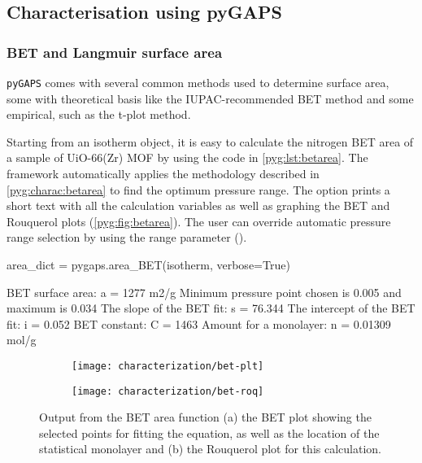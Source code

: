\subsection{Characterisation using pyGAPS}

\subsubsection{\gls{BET} and Langmuir surface area}

\texttt{pyGAPS} comes with several common methods used to
determine surface area, some with theoretical basis like
the \gls{IUPAC}-recommended \gls{BET} method and some empirical, such
as the t-plot method.

Starting from an isotherm object, it is easy to
calculate the nitrogen \gls{BET} area of a sample of UiO-66(Zr) \gls{MOF}
by using the code in \autoref{pyg:lst:betarea}.
The framework automatically applies the methodology described in
\autoref{pyg:charac:betarea} to find the optimum pressure range. 
The  option prints a short
text with all the calculation variables as well as graphing the
\gls{BET} and Rouquerol plots (\autoref{pyg:fig:betarea}).
The user can override automatic pressure range selection by using the
range parameter ().

\begin{samepage}
	\begin{python}[caption={Calculating a BET area},label={pyg:lst:betarea}]
area_dict = pygaps.area_BET(isotherm, verbose=True)
\end{python}
	\begin{pythonout}
BET surface area: a = 1277 m2/g
Minimum pressure point chosen is 0.005 and maximum is 0.034
The slope of the BET fit: 		s = 76.344
The intercept of the BET fit: 	i = 0.052
BET constant: 					C = 1463
Amount for a monolayer: 		n = 0.01309 mol/g
\end{pythonout}
\end{samepage}

\begin{figure}[!htb]
	\centering

	\begin{subfigure}{0.45\linewidth}
		\parbox[c]{0.1\linewidth}{\caption{}%
			\label{pyg:fig:betarea-plt}}
		\parbox[b]{0.85\linewidth}{%
			\texttt{[image: characterization/bet-plt]}}
	\end{subfigure}%
	\begin{subfigure}{0.45\linewidth}
		\parbox[c]{0.1\linewidth}{\caption{}%
			\label{pyg:fig:betarea-roq}}
		\parbox[b]{0.85\linewidth}{%
			\texttt{[image: characterization/bet-roq]}}
	\end{subfigure}%

	\caption{Output from the \gls{BET} area function (a) the \gls{BET} plot showing
		the selected points for fitting the equation, as well as the location
		of the statistical monolayer and (b) the Rouquerol plot for this
		calculation.}%
	\label{pyg:fig:betarea}

\end{figure}

